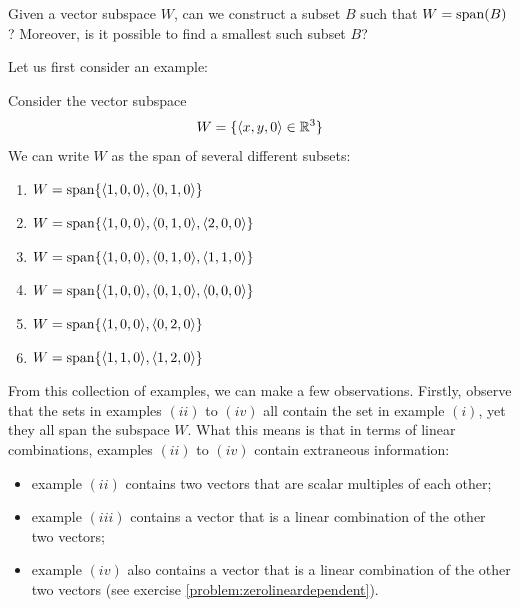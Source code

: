     \begin{motivating}
     Given a vector subspace $W$, can we construct a subset $B$ such that $W = \textnormal{span}(B)$?  Moreover, is it possible to find a smallest such subset $B$?  
    \end{motivating}
    
    Let us first consider an example:
    
    \begin{example}
    Consider the vector subspace $$W = \{\langle x, y, 0\rangle \in \mathbb{R}^3 \}$$
    We can write $W$ as the span of several different subsets:
    \begin{enumerate}[label=(\roman*)]
        \item $W= \textnormal{span}\{\langle 1,0,0\rangle, \langle 0,1,0\rangle\}$
        \item $W= \textnormal{span}\{\langle 1,0,0\rangle, \langle 0,1,0\rangle, \langle 2,0,0\rangle\}$
        \item $W= \textnormal{span}\{\langle 1,0,0\rangle, \langle 0,1,0\rangle,\langle 1,1,0\rangle\}$
        \item $W= \textnormal{span}\{\langle 1,0,0\rangle, \langle 0,1,0\rangle, \langle 0, 0, 0\rangle\}$
        \item $W= \textnormal{span}\{\langle 1,0,0\rangle, \langle 0,2,0\rangle\}$
        \item $W= \textnormal{span}\{\langle 1,1,0\rangle, \langle 1,2,0\rangle\}$
    \end{enumerate}
    
    \end{example}
    
    From this collection of examples, we can make a few observations.   Firstly, observe that the sets in examples $(ii)$ to $(iv)$ all contain the set in example $(i)$, yet they all span the subspace $W$.  What this means is that in terms of linear combinations, examples $(ii)$ to $(iv)$ contain extraneous information:
    \begin{itemize}
        \item example $(ii)$ contains two vectors that are scalar multiples of each other;
        \item example $(iii)$ contains a vector that is a linear combination of the other two vectors;
        \item example $(iv)$ also contains a vector that is a linear combination of the other two vectors (see exercise \ref{problem:zerolineardependent}).
    \end{itemize}


